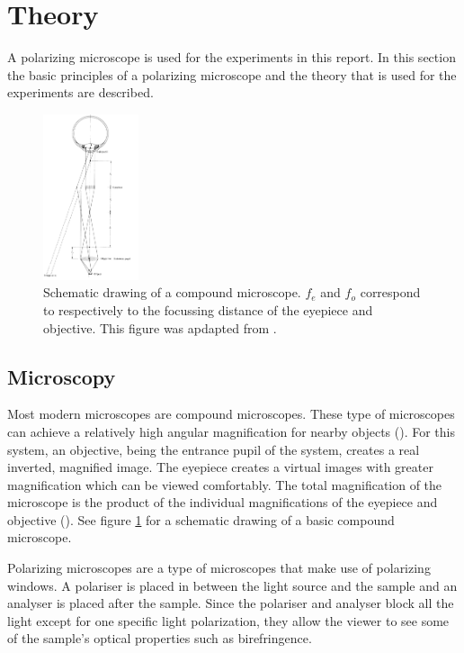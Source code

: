 \section{Theory}

A polarizing microscope is used for the experiments in this report. In this section the basic principles of a polarizing microscope and the theory that is used for the experiments are described.

\begin{figure}
    \includegraphics[width=0.25\textwidth]{afbeeldingen/compound_microscope.png}
  	\caption{Schematic drawing of a compound microscope. $f_{e}$ and $f_{o}$ correspond to respectively to the focussing distance of the eyepiece and objective. This figure was apdapted from \cite{hecht}.}
  	\label{fig_compound_microscope}
\end{figure}

\subsection{Microscopy}


Most modern microscopes are compound microscopes. These type of microscopes can achieve a relatively high angular magnification for nearby objects (\cite{hecht}). For this system, an objective, being the entrance pupil of the system, creates a real inverted, magnified image. The eyepiece creates a virtual images with greater magnification which can be viewed comfortably. The total magnification of the microscope is the product of the individual magnifications of the eyepiece and objective (\cite{hecht}). See figure \ref{fig_compound_microscope} for a schematic drawing of a basic compound microscope.


Polarizing microscopes are a type of microscopes that make use of polarizing windows. A polariser is placed in between the light source and the sample and an analyser is placed after the sample. Since the polariser and analyser block all the light except for one specific light polarization, they allow the viewer to see some of the sample's optical properties such as birefringence. 

